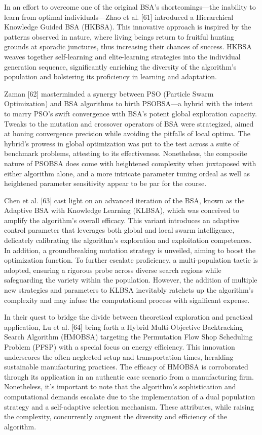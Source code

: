 \documentclass{article} %
\begin{document}
In an effort to overcome one of the original BSA's shortcomings---the inability to learn from optimal individuals---Zhao et al. [61] introduced a Hierarchical Knowledge Guided BSA (HKBSA). This innovative approach is inspired by the patterns observed in nature, where living beings return to fruitful hunting grounds at sporadic junctures, thus increasing their chances of success. HKBSA weaves together self-learning and elite-learning strategies into the individual generation sequence, significantly enriching the diversity of the algorithm's population and bolstering its proficiency in learning and adaptation.

Zaman [62] masterminded a synergy between PSO (Particle Swarm Optimization) and BSA algorithms to birth PSOBSA---a hybrid with the intent to marry PSO's swift convergence with BSA's potent global exploration capacity. Tweaks to the mutation and crossover operators of BSA were strategized, aimed at honing convergence precision while avoiding the pitfalls of local optima. The hybrid's prowess in global optimization was put to the test across a suite of benchmark problems, attesting to its effectiveness. Nonetheless, the composite nature of PSOBSA does come with heightened complexity when juxtaposed with either algorithm alone, and a more intricate parameter tuning ordeal as well as heightened parameter sensitivity appear to be par for the course.

Chen et al. [63] cast light on an advanced iteration of the BSA, known as the Adaptive BSA with Knowledge Learning (KLBSA), which was conceived to amplify the algorithm's overall efficacy. This variant introduces an adaptive control parameter that leverages both global and local swarm intelligence, delicately calibrating the algorithm's exploration and exploitation competences. In addition, a groundbreaking mutation strategy is unveiled, aiming to boost the optimization function. To further escalate proficiency, a multi-population tactic is adopted, ensuring a rigorous probe across diverse search regions while safeguarding the variety within the population. However, the addition of multiple new strategies and parameters to KLBSA inevitably ratchets up the algorithm's complexity and may infuse the computational process with significant expense.

In their quest to bridge the divide between theoretical exploration and practical application, Lu et al. [64] bring forth a Hybrid Multi-Objective Backtracking Search Algorithm (HMOBSA) targeting the Permutation Flow Shop Scheduling Problem (PFSP) with a special focus on energy efficiency. This innovation underscores the often-neglected setup and transportation times, heralding sustainable manufacturing practices. The efficacy of HMOBSA is corroborated through its application in an authentic case scenario from a manufacturing firm. Nonetheless, it's important to note that the algorithm's sophistication and computational demands escalate due to the implementation of a dual population strategy and a self-adaptive selection mechanism. These attributes, while raising the complexity, concurrently augment the diversity and efficiency of the algorithm.
\end{document}
